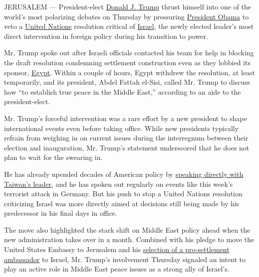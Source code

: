 JERUSALEM --- President-elect
\href{http://www.nytimes.com/topic/person/donald-trump?inline=nyt-per}{Donald
J. Trump} thrust himself into one of the world's most polarizing debates
on Thursday by pressuring
\href{http://topics.nytimes.com/top/reference/timestopics/people/o/barack_obama/index.html?inline=nyt-per}{President
Obama} to veto a
\href{http://topics.nytimes.com/top/reference/timestopics/organizations/u/united_nations/index.html?inline=nyt-org}{United
Nations} resolution critical of
\href{http://www.nytimes.com/topic/destination/israel}{Israel}, the
newly elected leader's most direct intervention in foreign policy during
his transition to power.

Mr. Trump spoke out after Israeli officials contacted his team for help
in blocking the draft resolution condemning settlement construction even
as they lobbied its sponsor,
\href{http://www.nytimes.com/topic/destination/egypt}{Egypt}. Within a
couple of hours, Egypt withdrew the resolution, at least temporarily,
and its president, Abdel Fattah el-Sisi, called Mr. Trump to discuss how
``to establish true peace in the Middle East,'' according to an aide to
the president-elect.

Mr. Trump's forceful intervention was a rare effort by a new president
to shape international events even before taking office. While new
presidents typically refrain from weighing in on current issues during
the interregnum between their election and inauguration, Mr. Trump's
statement underscored that he does not plan to wait for the swearing in.

He has already upended decades of American policy by
\href{http://www.nytimes.com/2016/12/02/us/politics/trump-speaks-with-taiwans-leader-a-possible-affront-to-china.html?_r=0}{speaking
directly with Taiwan's leader}, and he has spoken out regularly on
events like this week's terrorist attack in Germany. But his push to
stop a United Nations resolution criticizing Israel was more directly
aimed at decisions still being made by his predecessor in his final days
in office.

The move also highlighted the stark shift on Middle East policy ahead
when the new administration takes over in a month. Combined with his
pledge to move the United States Embassy to Jerusalem and his
\href{http://www.nytimes.com/2016/12/15/us/politics/donald-trump-david-friedman-israel-ambassador.html}{selection
of a pro-settlement ambassador} to Israel, Mr. Trump's involvement
Thursday signaled an intent to play an active role in Middle East peace
issues as a strong ally of Israel's.

